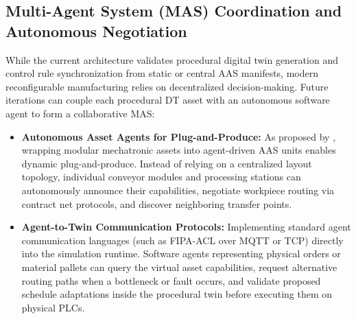 \subsection{Multi-Agent System (\texorpdfstring{\gls{MAS}}{MAS}) Coordination and Autonomous Negotiation}
While the current architecture validates procedural digital twin generation and control rule synchronization from static or central \gls{AAS} manifests, modern reconfigurable manufacturing relies on decentralized decision-making. Future iterations can couple each procedural \gls{DT} asset with an autonomous software agent to form a collaborative \gls{MAS}:
\begin{itemize}
    \item \textbf{Autonomous Asset Agents for Plug-and-Produce:} As proposed by \textcite{Rocha2024}, wrapping modular mechatronic assets into agent-driven \gls{AAS} units enables dynamic plug-and-produce. Instead of relying on a centralized layout topology, individual conveyor modules and processing stations can autonomously announce their capabilities, negotiate workpiece routing via contract net protocols, and discover neighboring transfer points.
    \item \textbf{Agent-to-Twin Communication Protocols:} Implementing standard agent communication languages (such as FIPA-ACL over \gls{MQTT} or \gls{TCP}) directly into the simulation runtime. Software agents representing physical orders or material pallets can query the virtual asset capabilities, request alternative routing paths when a bottleneck or fault occurs, and validate proposed schedule adaptations inside the procedural twin before executing them on physical \glspl{PLC}.
\end{itemize}

